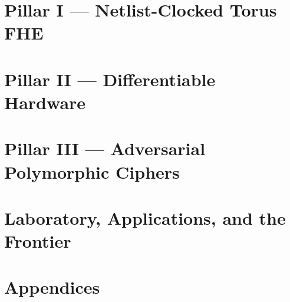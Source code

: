 \documentclass[11pt,oneside,openany]{book}
\begin{document}




\part{Pillar I --- Netlist-Clocked Torus FHE}





\part{Pillar II --- Differentiable Hardware}



\part{Pillar III --- Adversarial Polymorphic Ciphers}



\part{Laboratory, Applications, and the Frontier}






\appendix
\part{Appendices}






\backmatter


\end{document}
